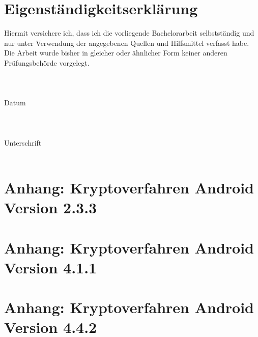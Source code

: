 \documentclass[10pt, a4paper,headsepline,pointednumbers]{scrreprt}
\begin{document}

\chapter{Eigenständigkeitserklärung}
\vspace*{\fill}
Hiermit versichere ich, dass ich die vorliegende Bachelorarbeit selbstständig und nur unter Verwendung der angegebenen Quellen und Hilfsmittel verfasst habe. Die Arbeit wurde bisher in gleicher oder ähnlicher Form keiner anderen Prüfungsbehörde vorgelegt. \\ \\ \\ \\
\hfill
\hfill
Datum \\ \\ \\ \\
\hfill
\hfill
Unterschrift \\ \\
\vspace*{\fill}





\chapter{Anhang: Kryptoverfahren Android Version 2.3.3}


\chapter{Anhang: Kryptoverfahren Android Version 4.1.1}


\chapter{Anhang: Kryptoverfahren Android Version 4.4.2}

\end{document}
